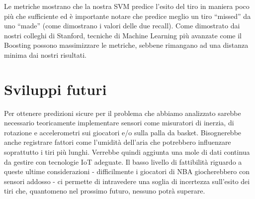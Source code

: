 Le metriche mostrano che la nostra SVM predice l’esito del tiro in maniera poco più che sufficiente ed è importante notare che predice meglio un tiro “missed” da uno “made” (come dimostrano i valori delle due recall).
Come dimostrato dai nostri colleghi di Stanford, tecniche di Machine Learning più avanzate come il Boosting possono massimizzare le metriche, sebbene rimangano ad una distanza minima dai nostri risultati.
\section{Sviluppi futuri}
Per ottenere predizioni sicure per il problema che abbiamo analizzato sarebbe necessario teoricamente implementare sensori come misuratori di inerzia, di rotazione e accelerometri sui giocatori e/o sulla palla da basket. Bisognerebbe anche registrare fattori come l’umidità dell’aria che potrebbero influenzare soprattutto i tiri più lunghi. Verrebbe quindi aggiunta una mole di dati continua da gestire con tecnologie IoT adeguate. Il basso livello di fattibilità riguardo a queste ultime considerazioni - difficilmente i giocatori di NBA giocherebbero con sensori addosso - ci permette di intravedere una soglia di incertezza sull’esito dei tiri che, quantomeno nel prossimo futuro, nessuno potrà superare.

